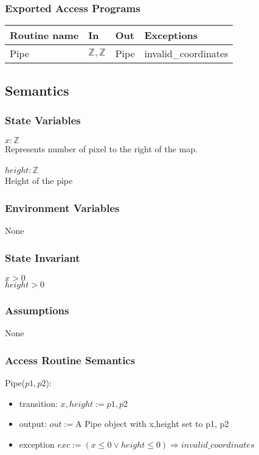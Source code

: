 \documentclass[12pt]{article}
\begin{document}
\subsubsection* {Exported Access Programs}

\begin{tabular}{| l | l | l | l |}
\hline
\textbf{Routine name} & \textbf{In} & \textbf{Out} & \textbf{Exceptions}\\
\hline
Pipe &$\mathbb{Z}, \mathbb{Z}$ & Pipe & invalid\_coordinates\\
\hline

\end{tabular}

\subsection* {Semantics}

\subsubsection* {State Variables}

$x: \mathbb{Z}$\\
Represents number of pixel to the right of the map.\\ 
\\
$height: \mathbb{Z}$\\
Height of the pipe\\

\subsubsection* {Environment Variables}

None

\subsubsection* {State Invariant}
$x > 0$\\
$height > 0$\\ 
\subsubsection* {Assumptions}
None
\subsubsection* {Access Routine Semantics}

\noindent Pipe($p1, p2$):
\begin{itemize}
\item transition: $x, height := p1, p2$
\item output: $out := $A Pipe object with x,height set to p1, p2
\item exception $ exc := (x \leq 0 \lor height \leq 0 ) \Rightarrow invalid\_coordinates $
\end{itemize}
\end{document}
